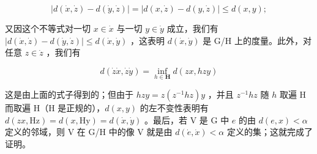 \[
\left| d (\dot {x}, \dot {z}) - d (\dot {y}, \dot {z}) \right| = \left| d (x, \dot {z}) - d (y, \dot {z}) \right| \leqslant d (x, y);
\]

又因这个不等式对一切 \(x \in \dot{x}\) 与一切 \(y \in \dot{y}\) 成立，我们有 \(|d(\dot{x}, \dot{z}) - d(\dot{y}, \dot{z})| \leqslant d(\dot{x}, \dot{y})\) ，这表明 \(d(\dot{x}, \dot{y})\) 是 G/H 上的度量。此外，对任意 \(z \in \dot{z}\) ，我们有

\[
d (\dot {z} \dot {x}, \dot {z} \dot {y}) = \inf _ {h \in \mathbf {H}} d (z x, h z y)
\]

这是由上面的式子得到的；但由于 \(hzy = z(z^{-1}hz)y\) ，并且 \(z^{-1}hz\) 随 \(h\) 取遍 H 而取遍 H（H 是正规的），\(d(x,y)\) 的左不变性表明有 \(d(zx, \mathrm{Hz}) = d(x, \mathrm{Hy}) = d(\dot{x}, \dot{y})\) 。最后，若 V 是 G 中 \(e\) 的由 \(d(e, x) < \alpha\) 定义的邻域，则 V 在 G/H 中的像 V 就是由 \(d(\dot{e}, \dot{x}) < \alpha\) 定义的集；这就完成了证明。

